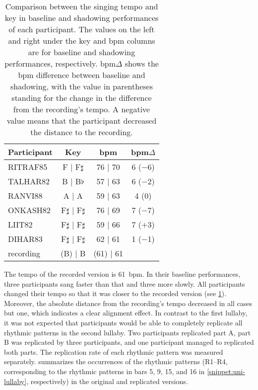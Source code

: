 \begin{table}[t]
	\caption[Key and \acs{bpm} deviation summary]
			{Comparison between the singing tempo and key in baseline and shadowing performances of each participant.
			The values on the left and right under the key and \acs{bpm} columns are for baseline and shadowing performances, respectively.
			\acs{bpm}$\Delta$ shows the \acs{bpm} difference between baseline and shadowing, with the value in parentheses standing for the change in the difference from the recording's tempo.
			A negative value means that the participant decreased the distance to the recording.}
	\label{tab:bpm_and_keys}
	\centering
	\begin{tabularx}{\linewidth}{Xccc}
		\toprule
		\bfseries{Participant}	& \bfseries{Key}			& \bfseries{\acs{bpm}}		& \bfseries{\acs{bpm}$\Delta$}	\\
		\midrule
		RITRAF85				& F  |  F$\sharp$			& 76  |  70					&  6 ($-$6)						\\
		TALHAR82				& B  |  B$\flat$			& 57  |  63					&  6 ($-$2)						\\
		RANVI88					& A  |  A					& 59  |  63					&  4 (\phantom{$-$}0)			\\
		ONKASH82				& F$\sharp$  |  F$\sharp$	& 76  |  69					&  7 ($-$7)						\\
		LIIT82					& F$\sharp$  |  F$\sharp$	& 59  |  66					&  7 ($+$3)						\\
		DIHAR83					& F$\sharp$  |  F$\sharp$	& 62  |  61					&  1 ($-$1)						\\
		\rule{0pt}{0.5cm}%
		recording				& (B) | B					& (61) | 61					&								\\
		\bottomrule
	\end{tabularx}
\end{table}
%
The tempo of the recorded version is \SI{61}{\ac{bpm}}.
In their baseline performances, three participants sang faster than that and three more slowly.
All participants changed their tempo so that it was closer to the recorded version (see \cref{tab:bpm_and_keys}).
Moreover, the absolute distance from the recording's tempo decreased in all cases but one, which indicates a clear alignment effect.
In contrast to the first lullaby, it was not expected that participants would be able to completely replicate all rhythmic patterns in the second lullaby.
Two participants replicated part A, part B was replicated by three participants, and one participant managed to replicated both parts.
The replication rate of each rhythmic pattern was measured separately.
 summarizes the occurrences of the rhythmic patterns (R1--R4, corresponding to the rhythmic patterns in bars 5, 9, 15, and 16 in \cref{snippet:uni-lullaby}, respectively) in the original and replicated versions.
